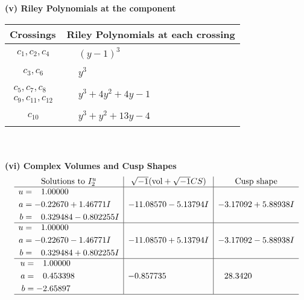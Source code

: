 \documentclass[1p]{elsarticle_modified}
\theoremstyle{definition}
\newcommand{\I}{\sqrt{-1}}
\begin{document}
\flushleft \textbf{(v) Riley Polynomials at the component}\newline \\
\begin{tabular}{m{50pt}|m{274pt}}
Crossings & \hspace{64pt}Riley Polynomials at each crossing \\
\hline $$\begin{aligned}c_{1},c_{2},c_{4}\end{aligned}$$&$\begin{aligned}
&(y-1)^3
\end{aligned}$\\
\hline $$\begin{aligned}c_{3},c_{6}\end{aligned}$$&$\begin{aligned}
&y^3
\end{aligned}$\\
\hline $$\begin{aligned}c_{5},c_{7},c_{8}\\c_{9},c_{11},c_{12}\end{aligned}$$&$\begin{aligned}
&y^3+4 y^2+4 y-1
\end{aligned}$\\
\hline $$\begin{aligned}c_{10}\end{aligned}$$&$\begin{aligned}
&y^3+y^2+13 y-4
\end{aligned}$\\
\hline
\end{tabular}\\~\\
\newpage\flushleft \textbf{(vi) Complex Volumes and Cusp Shapes}
$$\begin{array}{c|c|c}  
\text{Solutions to }I^u_{2}& \I (\text{vol} + \sqrt{-1}CS) & \text{Cusp shape}\\
 \hline 
\begin{aligned}
u &= \phantom{-}1.00000\phantom{ +0.000000I} \\
a &= -0.22670 + 1.46771 I \\
b &= \phantom{-}0.329484 - 0.802255 I\end{aligned}
 & -11.08570 - 5.13794 I & -3.17092 + 5.88938 I \\ \hline\begin{aligned}
u &= \phantom{-}1.00000\phantom{ +0.000000I} \\
a &= -0.22670 - 1.46771 I \\
b &= \phantom{-}0.329484 + 0.802255 I\end{aligned}
 & -11.08570 + 5.13794 I & -3.17092 - 5.88938 I \\ \hline\begin{aligned}
u &= \phantom{-}1.00000\phantom{ +0.000000I} \\
a &= \phantom{-}0.453398\phantom{ +0.000000I} \\
b &= -2.65897\phantom{ +0.000000I}\end{aligned}
 & -0.857735\phantom{ +0.000000I} & \phantom{-}28.3420\phantom{ +0.000000I}\\
 \hline 
 \end{array}$$\newpage\newpage\renewcommand{\arraystretch}{1}
\end{document}
